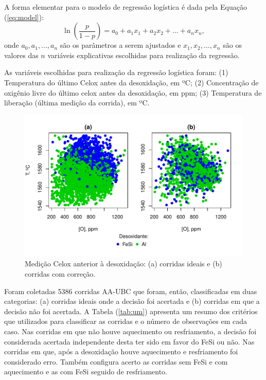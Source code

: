 	A forma elementar para o modelo de regressão logística é dada pela Equação (\ref{eq:model}):	
	\begin{equation}
		\label{eq:model}
		\ln \left( \frac{p}{1-p} \right) = a_0 + a_1 x_1 + a_2 x_2 + ... + a_n x_n,
	\end{equation}	
	\noindent onde $a_0, a_1, ..., a_n$ são os parâmetros a serem ajustados e $x_1, x_2, ..., x_n$ são os valores das $n$ variáveis explicativas escolhidas para realização da regressão. 
	
	As variáveis escolhidas para realização da regressão logística foram: (1) Temperatura do último Celox antes da desoxidação, em ºC; 
	(2) Concentração de oxigênio livre do último celox antes da desoxidação, em ppm; (3) Temperatura de liberação (última medição da corrida), em ºC.
	\begin{figure}[H]
		\centering
		\includegraphics[scale=0.55, bb=0 0 432 280, trim=0in 20pt 0in 0in]{figures/fig01.pdf}
		\caption{Medição Celox anterior à desoxidação: (a) corridas ideais e  (b) corridas com correção.}
		\label{fig:ace}
	\end{figure}		
	Foram coletadas 5386 corridas AA-UBC que foram, então, classificadas em duas categorias: (a) corridas ideais onde a decisão foi acertada e (b) corridas em que a decisão não foi acertada. A Tabela (\ref{tab:um}) apresenta um resumo dos critérios que utilizados para classificar as corridas e o número de observações em cada caso. Nas corridas em que não houve aquecimento ou resfriamento, a decisão foi considerada acertada independente desta ter sido em favor do FeSi ou não. Nas corridas em que, após a desoxidação houve aquecimento e resfriamento foi considerado erro. Também configura acerto as corridas sem FeSi e com aquecimento e as com FeSi seguido de resfriamento.

